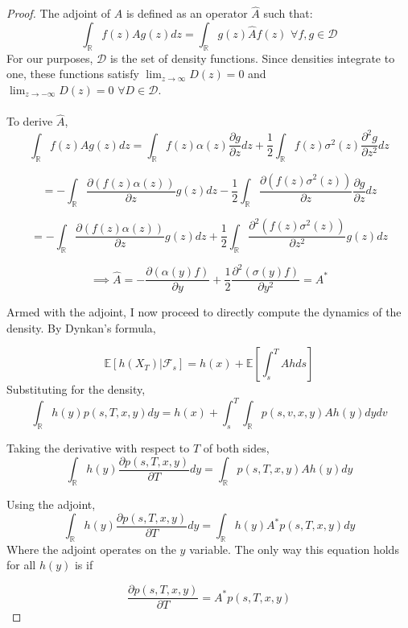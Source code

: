 \documentclass{article}
\theoremstyle{definition}
\begin{document}
\begin{proof}
	The adjoint of \(A\) is defined as an operator \(\hat{A}\) such that:
	\[\int_\mathbb{R} f(z) A g(z) dz = \int_\mathbb{R} g(z) \hat{A} f(z)\,\,\forall f, g \in \mathcal{D}\]
	For our purposes, \(\mathcal{D}\) is the set of density functions.  Since densities integrate to one, these functions satisfy \(\lim_{z \to \infty } D(z) =0 \) and \(\lim_{z \to -\infty} D(z)=0\,\,\forall D \in \mathcal{D}\).
	\\
	\\
	To derive \(\hat{A}\),  
	\[\int_\mathbb{R} f(z) A g(z) dz  = \int_\mathbb{R}  f(z)  \alpha(z) \frac{\partial g}{\partial z} dz+\frac{1}{2} \int_\mathbb{R} f(z)\sigma^2(z) \frac{\partial^2 g}{\partial z^2} dz \]
	
	\[= - \int_\mathbb{R}  \frac{\partial \left( f(z)  \alpha(z) \right)}{\partial z} g(z) dz -\frac{1}{2} \int_\mathbb{R} \frac{\partial \left(f(z)\sigma^2(z)\right) }{\partial z} \frac{\partial g}{\partial z} dz   \]
	
	\[ = - \int_\mathbb{R}  \frac{\partial \left( f(z)  \alpha(z) \right)}{\partial z} g(z) dz +\frac{1}{2} \int_\mathbb{R} \frac{\partial ^2 \left(f(z)\sigma^2(z) \right)}{\partial z^2} g(z) dz   \]
	
	
	\[ \implies \hat{A}= -\frac{\partial \left(\alpha(y) f\right)}{\partial y} + \frac{1}{2}\frac{\partial^2 \left(\sigma(y) f\right) } {\partial y^2} =A^* \]
	
	Armed with the adjoint, I now proceed to directly compute the dynamics of the density.  By Dynkan's formula,
	
	\[ \mathbb{E}[h(X_T)|\mathcal{F}_s]= h(x)+\mathbb{E}\left[\int_s^T A h ds \right]  \]
	Substituting for the density, 
	\[\int_\mathbb{R} h(y) p(s, T, x, y) dy = h(x)+ \int_s^T  \int_\mathbb{R}p(s, v, x, y) A h(y)   dy dv   \]
	
	Taking the derivative with respect to \(T\) of both sides,
	\[\int_\mathbb{R} h(y) \frac{\partial p(s, T, x, y)}{\partial T} dy = \int_\mathbb{R}  p(s, T, x, y) A h(y) dy   \]
	
	Using the adjoint,
	\[\int_\mathbb{R} h(y) \frac{\partial p(s, T, x, y)}{\partial T} dy= \int_\mathbb{R}  h(y) A^* p(s, T, x, y) dy  \]
	Where the adjoint operates on the \(y\) variable.  The only way this equation holds for all \(h(y)\) is if 
	
	\[\frac{\partial p(s, T, x, y)}{\partial T} = A^* p(s, T, x, y)  \]
	
	
\end{proof}
\end{document}
